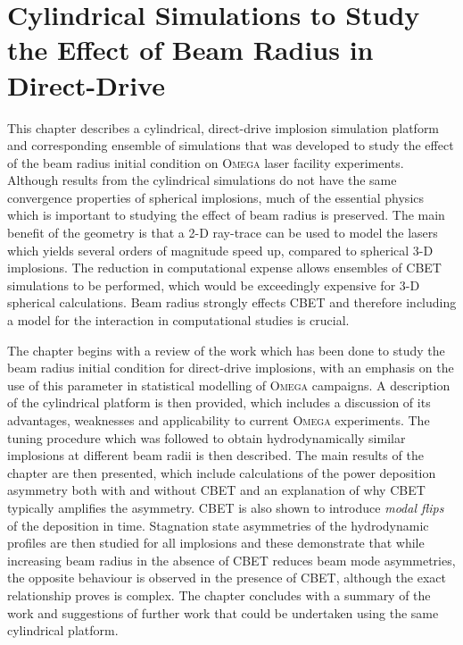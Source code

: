 \chapter{Cylindrical Simulations to Study the Effect of Beam Radius in Direct-Drive}

This chapter describes a cylindrical, direct-drive implosion simulation platform and corresponding ensemble of simulations that was developed to study the effect of the beam radius initial condition on \textsc{Omega} laser facility experiments.
Although results from the cylindrical simulations do not have the same convergence properties of spherical implosions, much of the essential physics which is important to studying the effect of beam radius is preserved.
The main benefit of the geometry is that a 2-D ray-trace can be used to model the lasers which yields several orders of magnitude speed up, compared to spherical 3-D implosions.
The reduction in computational expense allows ensembles of \ac{CBET} simulations to be performed, which would be exceedingly expensive for 3-D spherical calculations.
Beam radius strongly effects \ac{CBET} and therefore including a model for the interaction in computational studies is crucial.

The chapter begins with a review of the work which has been done to study the beam radius initial condition for direct-drive implosions, with an emphasis on the use of this parameter in statistical modelling of \textsc{Omega} campaigns.
A description of the cylindrical platform is then provided, which includes a discussion of its advantages, weaknesses and applicability to current \textsc{Omega} experiments.
The tuning procedure which was followed to obtain hydrodynamically similar implosions at different beam radii is then described.
The main results of the chapter are then presented, which include calculations of the power deposition asymmetry both with and without \ac{CBET} and an explanation of why \ac{CBET} typically amplifies the asymmetry.
\ac{CBET} is also shown to introduce \textit{modal flips} of the deposition in time.
Stagnation state asymmetries of the hydrodynamic profiles are then studied for all implosions and these demonstrate that while increasing beam radius in the absence of \ac{CBET} reduces beam mode asymmetries, the opposite behaviour is observed in the presence of \ac{CBET}, although the exact relationship proves is complex.
The chapter concludes with a summary of the work and suggestions of further work that could be undertaken using the same cylindrical platform.

